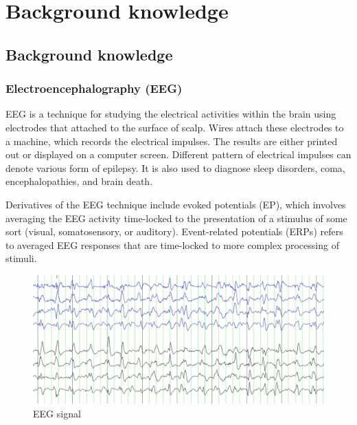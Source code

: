 \chapter{Background knowledge}

\label{ch:Background knowledge}

\setlength{\parindent}{4em}
\setlength{\parskip}{1em}
\renewcommand{\baselinestretch}{1.5}

\section{Background knowledge}

\subsection {Electroencephalography (EEG)}

\hspace{1.5cm} EEG is a technique for studying the electrical activities within the brain using electrodes that attached to the surface of scalp. Wires attach these electrodes to a machine, which records the electrical impulses. The results are either printed out or displayed on a computer screen. Different pattern of electrical impulses can denote various form of epilepsy\cite{ref9}. It is also used to diagnose sleep disorders, coma, encephalopathies, and brain death.\par
Derivatives of the EEG technique include evoked potentials (EP), which involves averaging the EEG activity time-locked to the presentation of a stimulus of some sort (visual, somatosensory, or auditory). Event-related potentials (ERPs) refers to averaged EEG responses that are time-locked to more complex processing of stimuli.



\begin{figure}[h]
	\centering
	\includegraphics[scale = 0.5]{chapter3/31.pdf}
	\caption{EEG signal}
\end{figure}
\newpage

